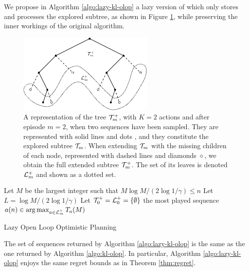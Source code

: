 We propose in Algorithm \ref{algo:lazy-kl-olop} a lazy version of \KLOLOP which only stores and processes the explored subtree, as shown in Figure \ref{fig:tree}, while preserving the inner workings of the original algorithm.

\begin{figure}[ht]
	\centering
	\includegraphics[width=0.6\textwidth]{img/tree_svg-tex}
	\caption{A representation of the tree $\mathcal{T}_m^+$, with $K = 2$ actions and after episode $m = 2$, when two sequences have been sampled. They are represented with solid lines and dots \textbullet, and they constitute the explored subtree $\mathcal{T}_m$. When extending $\mathcal{T}_m$ with the missing children of each node, represented with dashed lines and diamonds $\diamond$, we obtain the full extended subtree $\mathcal{T}_m^+$. The set of its leaves is denoted $\mathcal{L}_m^+$ and shown as a dotted set.}
	\label{fig:tree}
\end{figure}

\begin{algorithm}[tp]
	\DontPrintSemicolon
	Let $M$ be the largest integer such that $M \log M/(2 \log 1/\gamma) \leq n$\;
	Let $L = \log M / (2 \log 1/\gamma)$\;
	Let $\mathcal{T}_0^+ = \mathcal{L}_0^+ = \{\emptyset\}$\;
	\Return the most played sequence $a(n) \in \operatorname*{arg\,max}_{a\in \mathcal{L}_m^+} T_a(M)$
	\caption{Lazy Open Loop Optimistic Planning}
	\label{algo:lazy-kl-olop}
\end{algorithm}

\begin{theorem}[Consistency]
	\label{thm:consistency}
	The set of sequences returned by Algorithm \ref{algo:lazy-kl-olop} is the same as the one returned by Algorithm \ref{algo:kl-olop}.
	In particular, Algorithm \ref{algo:lazy-kl-olop} enjoys the same regret bounds as in Theorem \ref{thm:regret}.
\end{theorem}


